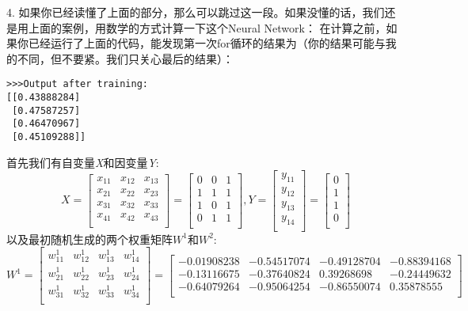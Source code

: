 \documentclass[a4paper,12pt,oneside]{book}
\begin{document}
4. 如果你已经读懂了上面的部分，那么可以跳过这一段。如果没懂的话，我们还是用上面的案例，用数学的方式计算一下这个Neural Network：
在计算之前，如果你已经运行了上面的代码，能发现第一次for循环的结果为（你的结果可能与我的不同，但不要紧。我们只关心最后的结果）：
\begin{lstlisting}
>>>Output after training:  
[[0.43888284]
 [0.47587257]
 [0.46470967]
 [0.45109288]]
\end{lstlisting}
首先我们有自变量\textit{X}和因变量\textit{Y}:
\begin{equation*}
    X = \begin{bmatrix}
        x_{11} & x_{12} & x_{13} \\
        x_{21} & x_{22} & x_{23} \\
        x_{31} & x_{32} & x_{33} \\
        x_{41} & x_{42} & x_{43} \\
    \end{bmatrix}
    = \begin{bmatrix}
        0 & 0 & 1\\
        1 & 1 & 1\\
        1 & 0 & 1\\
        0 & 1 & 1\\
    \end{bmatrix}
    , Y = \begin{bmatrix}
        y_{11}\\
        y_{12}\\
        y_{13}\\
        y_{14}\\
    \end{bmatrix}
    = \begin{bmatrix}
        0 \\
        1 \\
        1 \\
        0 \\
    \end{bmatrix}
\end{equation*}
以及最初随机生成的两个权重矩阵\textit{$W^1$}和\textit{$W^2$}:
\begin{equation*}
    W^1 = \begin{bmatrix}
        w^1_{11} & w^1_{12} & w^1_{13} & w^1_{14} \\
        w^1_{21} & w^1_{22} & w^1_{23} & w^1_{24} \\
        w^1_{31} & w^1_{32} & w^1_{33} & w^1_{34} \\
    \end{bmatrix}
    = \begin{bmatrix}
        -0.01908238 & -0.54517074 & -0.49128704 & -0.88394168\\
        -0.13116675 & -0.37640824 & 0.39268698 & -0.24449632\\
        -0.64079264 & -0.95064254 & -0.86550074 & 0.35878555\\
    \end{bmatrix}
\end{equation*}
\end{document}
